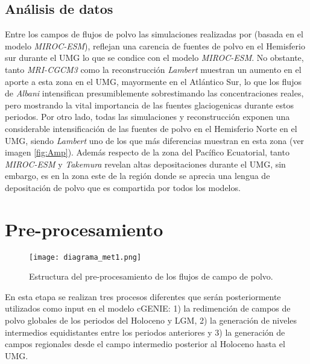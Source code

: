 \subsection*{Análisis de datos}

Entre los campos de flujos de polvo las simulaciones realizadas por \cite{takemura2009simulation} (basada en el modelo \textit{MIROC-ESM}), reflejan una carencia de fuentes de polvo en el Hemisferio sur durante el UMG lo que se condice con el modelo \textit{MIROC-ESM}. No obstante, tanto \textit{MRI-CGCM3} como la reconstrucción \textit{Lambert} muestran un aumento en el aporte a esta zona en el UMG, mayormente en el Atlántico Sur, lo que los flujos de \textit{Albani} intensifican presumiblemente sobrestimando las concentraciones reales, pero mostrando la vital importancia de las fuentes glaciogenicas durante estos periodos. Por otro lado, todas las simulaciones y reconstrucción exponen una considerable intensificación de las fuentes de polvo en el Hemisferio Norte en el UMG, siendo \textit{Lambert} uno de los que más diferencias muestran en esta zona (ver imagen \ref{fig:Amp}). Además respecto de la zona del Pacífico Ecuatorial, tanto \textit{MIROC-ESM} y \textit{Takemura} revelan altas depositaciones durante el UMG, sin embargo, es en la zona este de la región donde se aprecia una lengua de depositación de polvo que es compartida por todos los modelos. 

\section{Pre-procesamiento}

\begin{figure}[H]
\centering
  \texttt{[image: diagrama\_met1.png]}
  \caption[Pre-procesamiento de datos]{Estructura del pre-procesamiento de los flujos de campo de polvo.}
  \label{fig:diagrama_met1}
\end{figure}

En esta etapa se realizan tres procesos diferentes que serán posteriormente utilizados como input en el modelo cGENIE: 1) la redimención de campos de polvo globales de los periodos del Holoceno y LGM, 2) la generación de niveles intermedios equidistantes entre los periodos anteriores y 3) la generación de campos regionales desde el campo intermedio posterior al Holoceno hasta el UMG. 

